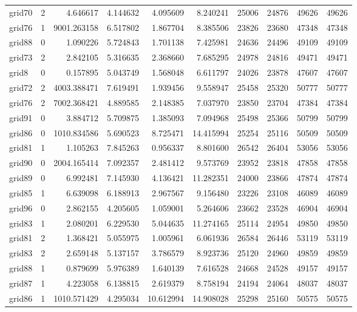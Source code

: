 \begin{longtable}{|l|r|r|r|r|r|r|r|r|r|}
grid70 & 2 & 4.646617 & 4.144632 & 4.095609 & 8.240241 & 25006 & 24876 & 49626 & 49626 \\
grid76 & 1 & 9001.263158 & 6.517802 & 1.867704 & 8.385506 & 23826 & 23680 & 47348 & 47348 \\
grid88 & 0 & 1.090226 & 5.724843 & 1.701138 & 7.425981 & 24636 & 24496 & 49109 & 49109 \\
grid73 & 2 & 2.842105 & 5.316635 & 2.368660 & 7.685295 & 24978 & 24816 & 49471 & 49471 \\
grid8 & 0 & 0.157895 & 5.043749 & 1.568048 & 6.611797 & 24026 & 23878 & 47607 & 47607 \\
grid72 & 2 & 4003.388471 & 7.619491 & 1.939456 & 9.558947 & 25458 & 25320 & 50777 & 50777 \\
grid76 & 2 & 7002.368421 & 4.889585 & 2.148385 & 7.037970 & 23850 & 23704 & 47384 & 47384 \\
grid91 & 0 & 3.884712 & 5.709875 & 1.385093 & 7.094968 & 25498 & 25366 & 50799 & 50799 \\
grid86 & 0 & 1010.834586 & 5.690523 & 8.725471 & 14.415994 & 25254 & 25116 & 50509 & 50509 \\
grid81 & 1 & 1.105263 & 7.845263 & 0.956337 & 8.801600 & 26542 & 26404 & 53056 & 53056 \\
grid90 & 0 & 2004.165414 & 7.092357 & 2.481412 & 9.573769 & 23952 & 23818 & 47858 & 47858 \\
grid89 & 0 & 6.992481 & 7.145930 & 4.136421 & 11.282351 & 24000 & 23866 & 47874 & 47874 \\
grid85 & 1 & 6.639098 & 6.188913 & 2.967567 & 9.156480 & 23226 & 23108 & 46089 & 46089 \\
grid96 & 0 & 2.862155 & 4.205605 & 1.059001 & 5.264606 & 23662 & 23528 & 46904 & 46904 \\
grid83 & 1 & 2.080201 & 6.229530 & 5.044635 & 11.274165 & 25114 & 24954 & 49850 & 49850 \\
grid81 & 2 & 1.368421 & 5.055975 & 1.005961 & 6.061936 & 26584 & 26446 & 53119 & 53119 \\
grid83 & 2 & 2.659148 & 5.137157 & 3.786579 & 8.923736 & 25120 & 24960 & 49859 & 49859 \\
grid88 & 1 & 0.879699 & 5.976389 & 1.640139 & 7.616528 & 24668 & 24528 & 49157 & 49157 \\
grid87 & 1 & 4.223058 & 6.138815 & 2.619379 & 8.758194 & 24194 & 24064 & 48037 & 48037 \\
grid86 & 1 & 1010.571429 & 4.295034 & 10.612994 & 14.908028 & 25298 & 25160 & 50575 & 50575 \\

\end{longtable}
